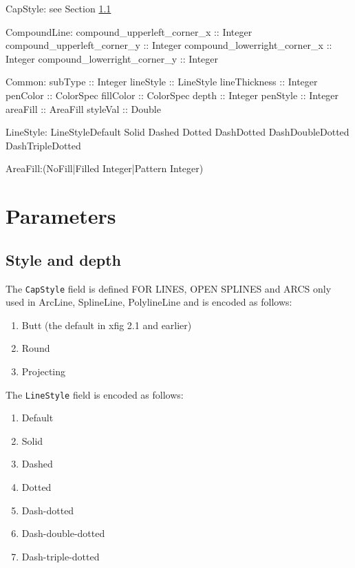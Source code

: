 \documentclass[10pt, a4paper]{article}
\begin{document}
CapStyle: see Section \ref{subsec:styDep}


CompoundLine:
compound\_upperleft\_corner\_x :: Integer
compound\_upperleft\_corner\_y :: Integer
compound\_lowerright\_corner\_x :: Integer
compound\_lowerright\_corner\_y :: Integer






Common:
subType :: Integer
lineStyle :: LineStyle
lineThickness :: Integer
penColor :: ColorSpec
fillColor :: ColorSpec
depth :: Integer
penStyle :: Integer
areaFill :: AreaFill
styleVal :: Double

LineStyle:
LineStyleDefault	 
Solid	 
Dashed	 
Dotted	 
DashDotted	 
DashDoubleDotted	 
DashTripleDotted	 



AreaFill:(NoFill|Filled Integer|Pattern Integer)





\section{Parameters}\label{sec:param}

\subsection{Style and depth}\label{subsec:styDep}

The {\tt CapStyle} field is defined FOR LINES, OPEN SPLINES and ARCS only 
used in ArcLine, SplineLine, PolylineLine
and is encoded as follows:
%
\begin{enumerate}
\item[0] Butt (the default in xfig 2.1 and earlier)
\item    Round
\item    Projecting
\end{enumerate}



\noindent
The {\tt LineStyle} field is encoded as follows:
%
\begin{enumerate}
\item[-1] Default
\item[0]  Solid
\item     Dashed
\item     Dotted
\item     Dash-dotted
\item     Dash-double-dotted
\item     Dash-triple-dotted
\end{enumerate}
\end{document}
